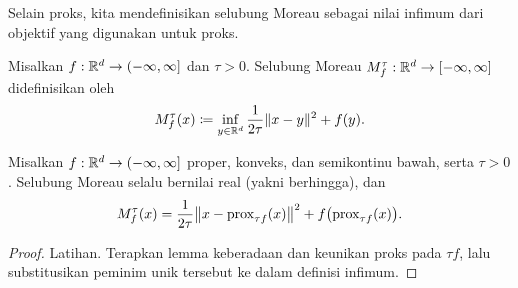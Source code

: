 Selain proks, kita mendefinisikan selubung Moreau sebagai nilai infimum dari objektif yang digunakan untuk proks.
\begin{defn}
    Misalkan \(f:\mathbb{R}^d\rightarrow(-\infty,\infty]\) dan \(\tau>0\). Selubung Moreau \(M_f^\tau:\mathbb{R}^d\rightarrow[-\infty,\infty]\) didefinisikan oleh
    \begin{equation}
        M_f^\tau(x)\coloneqq\inf_{y\in\mathbb{R}^d}\frac{1}{2\tau}\|x-y\|^2+f(y).
    \end{equation}
\end{defn}

\begin{lemma}
    Misalkan \(f:\mathbb{R}^d\rightarrow(-\infty,\infty]\) proper, konveks, dan semikontinu bawah, serta \(\tau>0\). Selubung Moreau selalu bernilai real (yakni berhingga), dan
    \begin{equation}
        M_f^\tau(x)
        =\frac{1}{2\tau}\bigl\|x-\mathrm{prox}_{\tau f}(x)\bigr\|^2
        +f\bigl(\mathrm{prox}_{\tau f}(x)\bigr).
    \end{equation}
\end{lemma}
\begin{proof}
    Latihan. Terapkan lemma keberadaan dan keunikan proks pada \(\tau f\), lalu substitusikan peminim unik tersebut ke dalam definisi infimum.
\end{proof}

